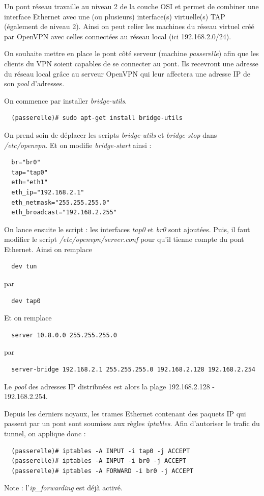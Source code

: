 \documentclass[a4paper]{article}
\begin{document}
Un pont réseau travaille au niveau 2 de la couche OSI et permet de combiner
une interface Ethernet avec une (ou plusieurs) interface(s) virtuelle(s) TAP (également de niveau 2).
Ainsi on peut relier les machines du réseau virtuel créé par OpenVPN avec celles 
connectées au réseau local (ici 192.168.2.0/24). 

On souhaite mettre en place le pont côté serveur (machine \textit{passerelle})
afin que les clients du VPN soient capables de se connecter au pont. Ils recevront
une adresse du réseau local grâce au serveur OpenVPN qui leur affectera une adresse
IP de son \textit{pool} d'adresses.

On commence par installer \textit{bridge-utils}.
\begin{verbatim}
  (passerelle)# sudo apt-get install bridge-utils
\end{verbatim}

On prend soin de déplacer les scripts \textit{bridge-utils} et \textit{bridge-stop}
dans \textit{/etc/openvpn}. Et on modifie \textit{bridge-start} ainsi :
\begin{verbatim}
  br="br0"
  tap="tap0"
  eth="eth1"
  eth_ip="192.168.2.1"
  eth_netmask="255.255.255.0"
  eth_broadcast="192.168.2.255"
\end{verbatim}

On lance ensuite le script : les interfaces \textit{tap0} et \textit{br0} sont ajoutées.
Puis, il faut modifier le script \textit{/etc/openvpn/server.conf} pour qu'il tienne 
compte du pont Ethernet.
Ainsi on remplace
\begin{verbatim}
  dev tun
\end{verbatim}
par
\begin{verbatim}
  dev tap0
\end{verbatim}

Et on remplace
\begin{verbatim}
  server 10.8.0.0 255.255.255.0
\end{verbatim}
par
\begin{verbatim}
  server-bridge 192.168.2.1 255.255.255.0 192.168.2.128 192.168.2.254
\end{verbatim}

Le \textit{pool} des adresses IP distribuées est alors la plage 192.168.2.128 - 192.168.2.254.

Depuis les derniers noyaux, les trames Ethernet contenant des paquets IP qui passent
par un pont sont soumises aux règles \textit{iptables}.
Afin d'autoriser le trafic du tunnel, on applique donc :
\begin{verbatim}
  (passerelle)# iptables -A INPUT -i tap0 -j ACCEPT
  (passerelle)# iptables -A INPUT -i br0 -j ACCEPT
  (passerelle)# iptables -A FORWARD -i br0 -j ACCEPT
\end{verbatim}
Note : l'\textit{ip\_forwarding} est déjà activé.
\end{document}
